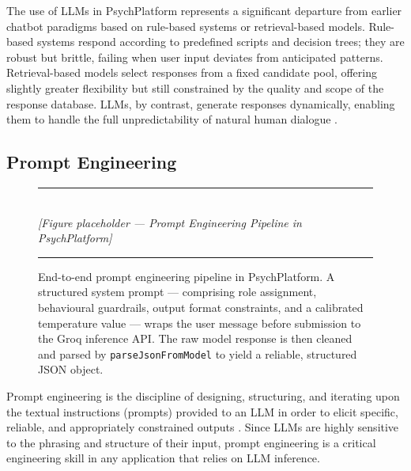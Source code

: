 The use of LLMs in PsychPlatform represents a significant departure from earlier
chatbot paradigms based on rule-based systems or retrieval-based models.
Rule-based systems respond according to predefined scripts and decision trees;
they are robust but brittle, failing when user input deviates from anticipated
patterns. Retrieval-based models select responses from a fixed candidate pool,
offering slightly greater flexibility but still constrained by the quality and
scope of the response database. LLMs, by contrast, generate responses
dynamically, enabling them to handle the full unpredictability of natural human
dialogue \cite{Brown2020}.

\subsection{Prompt Engineering}
\label{subsec:prompt}

\begin{figure}[H]
  \centering
  \rule{0.85\textwidth}{0.4pt}\\[6pt]
  {\small\itshape [Figure placeholder — Prompt Engineering Pipeline in PsychPlatform]}
  \rule{0.85\textwidth}{0.4pt}
  \caption{End-to-end prompt engineering pipeline in PsychPlatform. A structured
           system prompt — comprising role assignment, behavioural guardrails,
           output format constraints, and a calibrated temperature value — wraps
           the user message before submission to the Groq inference API. The raw
           model response is then cleaned and parsed by \texttt{parseJsonFromModel}
           to yield a reliable, structured JSON object.}
  \label{fig:prompt-pipeline}
\end{figure}

Prompt engineering is the discipline of designing, structuring, and iterating
upon the textual instructions (prompts) provided to an LLM in order to elicit
specific, reliable, and appropriately constrained outputs \cite{White2023}.
Since LLMs are highly sensitive to the phrasing and structure of their input,
prompt engineering is a critical engineering skill in any application that relies
on LLM inference.


